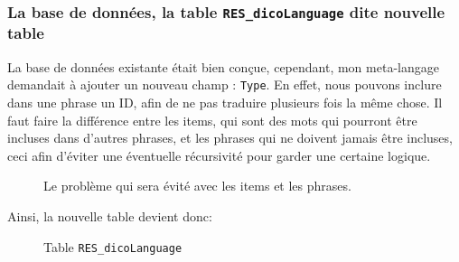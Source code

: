 		\subsubsection{La base de données, la table \texttt{RES\_dicoLanguage} dite nouvelle table}
			La base de données existante était bien conçue, cependant, mon meta-langage demandait à ajouter un nouveau champ : \texttt{Type}. En effet, nous pouvons inclure dans une phrase un ID, afin de ne pas traduire plusieurs fois la même chose. Il faut faire la différence entre les items, qui sont des mots qui pourront être incluses dans d'autres phrases, et les phrases qui ne doivent jamais être incluses, ceci afin d'éviter
		une éventuelle récursivité pour garder une certaine logique.
	
        \begin{figure}[H]
            \centering
            
            \caption{Le problème qui sera évité avec les items et les phrases.}
        \end{figure}
		Ainsi, la nouvelle table devient donc:

		\begin{figure}[H] %
			\centering
			
			\caption{Table \texttt{RES\_dicoLanguage}}
		\end{figure}


